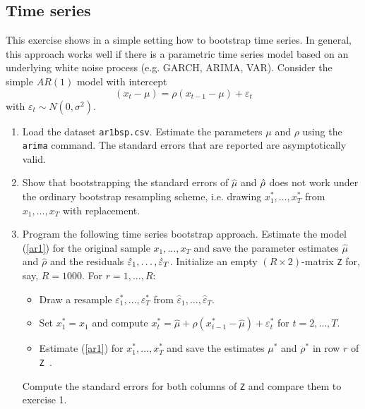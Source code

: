 \documentclass{article}
\begin{document}
\subsection{Time series}

This exercise shows in a simple setting how to bootstrap time series. In
general, this approach works well if there is a parametric time series model
based on an underlying white noise process (e.g. GARCH, ARIMA, VAR).
Consider the simple $AR(1)$ model with intercept%
\begin{equation}
\left( x_{t}-\mu \right) =\rho \left( x_{t-1}-\mu \right) +\varepsilon _{t}
\label{ar1}
\end{equation}%
with $\varepsilon _{t}\sim N(0,\sigma ^{2})$.
\begin{enumerate}\setlength{\itemsep}{0pt}
\item Load the dataset \texttt{ar1bsp.csv}. Estimate the parameters $\mu $
and $\rho $ using the \texttt{arima} command. The standard errors that are
reported are asymptotically valid.

\item Show that bootstrapping the standard errors of $\hat{\mu}$ and $\hat{%
\rho}$ does not work under the ordinary bootstrap resampling scheme, i.e.
drawing $x_{1}^{\ast },\ldots ,x_{T}^{\ast }$ from $x_{1},\ldots ,x_{T}$
with replacement.

\item Program the following time series bootstrap approach. Estimate the
model (\ref{ar1}) for the original sample $x_{1},\ldots ,x_{T}$ and save the
parameter estimates $\hat{\mu}$ and $\hat{\rho}$ and the residuals $\hat{%
\varepsilon}_{1},\ldots ,\hat{\varepsilon}_{T}$. Initialize an empty $\left(
R\times 2\right) $-matrix \texttt{Z} for, say, $R=1000$. For $r=1,\ldots ,R:$

\begin{itemize}\setlength{\itemsep}{0pt}
\item Draw a resample $\varepsilon _{1}^{\ast },\ldots ,\varepsilon
_{T}^{\ast }$ from $\hat{\varepsilon}_{1},\ldots ,\hat{\varepsilon}_{T}$.

\item Set $x_{1}^{\ast }=x_{1}$ and compute $x_{t}^{\ast }=\hat{\mu}+\hat{\rho}\left( x_{t-1}^{\ast }-\hat{\mu}\right) +\varepsilon _{t}^{\ast }$ for $t=2,\ldots ,T$.

\item Estimate (\ref{ar1}) for $x_{1}^{\ast },\ldots ,x_{T}^{\ast }$ and
save the estimates $\mu ^{\ast }$ and $\rho ^{\ast }$ in row $r$ of \texttt{Z%
}.
\end{itemize}
Compute the standard errors for both columns of \texttt{Z}
and compare them to exercise 1.
\end{enumerate}
\end{document}
